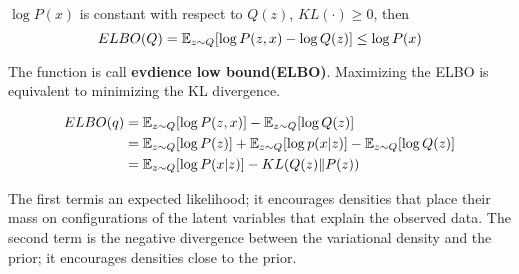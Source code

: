 $\log P(x)$ is constant with respect to $Q(z)$, $KL(\cdot ) \ge 0$, then
\begin{equation}
    ELBO(Q) = \mathbb{E}_{z \sim Q} [\log P(z, x) - \log Q(z)] \le \log P(x)
\end{equation}

The function is call \textbf{evdience low bound(ELBO)}. Maximizing the ELBO is equivalent to
minimizing the KL divergence.

\begin{equation}
    \begin{split}
        ELBO(q)
        &= \mathbb{E}_{z \sim Q} [\log P(z, x)] - \mathbb{E}_{z \sim Q} [\log Q(z)] \\
        &= \mathbb{E}_{z \sim Q} [\log P(z)] + \mathbb{E}_{z \sim Q} [\log p(x|z)] - \mathbb{E}_{z \sim Q} [\log Q(z)] \\
        &= \mathbb{E}_{z \sim Q} [\log P(x|z)] - KL(Q(z)\|P(z))
    \end{split}
\end{equation}

The first termis an expected likelihood; it encourages densities
that place their mass on configurations of the latent variables
that explain the observed data. The second term is the negative
divergence between the variational density and the prior; it encourages
densities close to the prior.